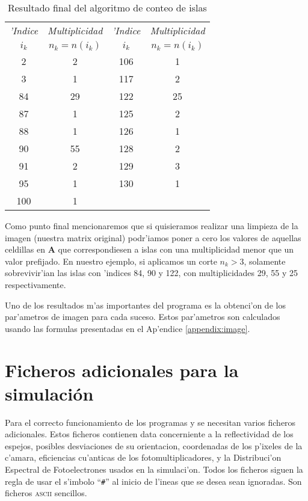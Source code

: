 \begin{table}[htbp]
\centering
\footnotesize
\begin{tabular}{|cc|cc|}
\hline
\emph{'Indice} & \emph{Multiplicidad} & \emph{'Indice} & \emph{Multiplicidad}\\
 $i_k$ & $n_k = n(i_k)$ & $i_k$ & $n_k = n(i_k)$ \\  
\hline
    2 &  2 &  106 &  1 \\
    3 &  1 &  117 &  2 \\
   84 & 29 &  122 & 25 \\
   87 &  1 &  125 &  2 \\
   88 &  1 &  126 &  1 \\
   90 & 55 &  128 &  2 \\
   91 &  2 &  129 &  3 \\
   95 &  1 &  130 &  1 \\
  100 &  1 &      &    \\
\hline
\end{tabular} 
\caption{Resultado final del algoritmo de conteo de islas}
\label{tab:islands}
\end{table}

Como punto final mencionaremos que si quisieramos realizar una
limpieza de la imagen (nuestra matrix original) podr'iamos poner a
cero los valores de aquellas celdillas en $\mathbf{A}$ que
correspondiesen a islas con una multiplicidad menor que un valor
prefijado.  En nuestro ejemplo, si aplicamos un corte $n_k>3$,
solamente sobrevivir'ian las islas con 'indices 84, 90 y 122, con
multiplicidades 29, 55 y 25 respectivamente.

\clearpage

Uno de los resultados m'as importantes del programa \camera es la
obtenci'on de los par'ametros de imagen para cada suceso.  Estos
par'ametros son calculados usando las formulas presentadas en el
Ap'endice \ref{appendix:image}.

\section{Ficheros adicionales para la simulaci\'on}
\label{sec:addfiles}

Para el correcto funcionamiento de los programas  y \camera
se necesitan varios ficheros adicionales.  Estos ficheros contienen
data concerniente a la reflectividad de los espejos, posibles
desviaciones de su orientacion, coordenadas de los p'ixeles de la
c'amara, eficiencias cu'anticas de los fotomultiplicadores, y la
Distribuci'on Espectral de Fotoelectrones usados en la simulaci'on.
Todos los ficheros siguen la regla de usar el s'imbolo ``\texttt{\#}''
al inicio de l'ineas que se desea sean ignoradas.  Son ficheros
\textsc{ascii} sencillos.

